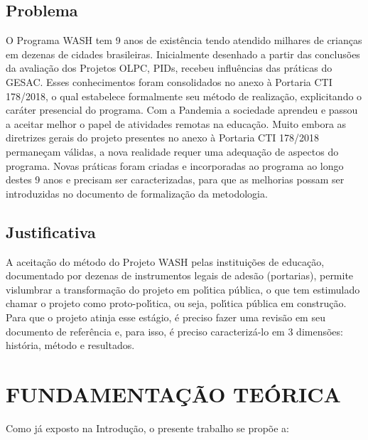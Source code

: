 \documentclass[
12pt,		%
openright,	%
twoside,  %
a4paper,			%
chapter=TITLE,		%
english,			%
french,				%
spanish,			%
brazil				%
]{USPSC-classe/USPSC_RedarTex}
\begin{document}
\section[Problema]{Problema}\label{Problema}
O Programa WASH tem 9 anos de exist\^encia tendo atendido milhares de crian\c{c}as em dezenas de cidades brasileiras. Inicialmente desenhado a partir das conclus\~oes da avalia\c{c}\~ao dos Projetos OLPC, PIDs, recebeu influ\^encias das pr\'aticas do GESAC. Esses conhecimentos foram consolidados no anexo \`a Portaria CTI 178/2018, o qual estabelece formalmente seu m\'etodo de realiza\c{c}\~ao, explicitando o car\'ater presencial do programa. Com a Pandemia a sociedade aprendeu e passou a aceitar melhor o papel de atividades remotas na educa\c{c}\~ao. Muito embora as diretrizes gerais do projeto presentes no anexo \`a Portaria CTI 178/2018 permane\c{c}am v\'alidas, a nova realidade requer uma adequa\c{c}\~ao de aspectos do programa. Novas pr\'aticas foram criadas e incorporadas ao programa ao longo destes 9 anos e precisam ser caracterizadas, para que as melhorias possam ser introduzidas no documento de formaliza\c{c}\~ao da metodologia.










\section[Justificativa]{Justificativa}\label{Justificativa}
A aceita\c{c}\~ao do m\'etodo do Projeto WASH pelas institui\c{c}\~oes de educa\c{c}\~ao, documentado por dezenas de instrumentos legais de ades\~ao (portarias), permite vislumbrar a transforma\c{c}\~ao do projeto em pol\'{\i}tica p\'ublica, o que tem estimulado chamar o projeto como \textquotedbl proto-pol\'{\i}tica\textquotedbl , ou seja, pol\'{\i}tica p\'ublica em constru\c{c}\~ao. Para que o projeto atinja esse est\'agio, \'e preciso fazer uma revis\~ao em seu documento de refer\^encia e, para isso, \'e preciso caracteriz\'a-lo em 3 dimens\~oes: hist\'oria, m\'etodo e resultados.










\chapter[FUNDAMENTA\c{C}\~AO TE\'ORICA ]{FUNDAMENTA\c{C}\~AO TE\'ORICA }\label{FUNDAMENTA\c{C}\~AO TE\'ORICA }
Como j\'a exposto na \textquotedbl Introdu\c{c}\~ao\textquotedbl , o presente trabalho se prop\~oe a:
\end{document}
